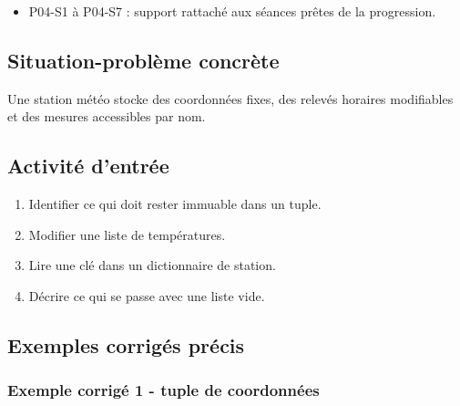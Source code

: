 \begin{itemize}
\tightlist
\item
  P04-S1 à P04-S7 : support rattaché aux séances prêtes de la
  progression.
\end{itemize}

\subsection{Situation-problème concrète}

Une station météo stocke des coordonnées fixes, des relevés horaires
modifiables et des mesures accessibles par nom.

\subsection{Activité d’entrée}

\begin{enumerate}
\def\labelenumi{\arabic{enumi}.}
\tightlist
\item
  Identifier ce qui doit rester immuable dans un tuple.
\item
  Modifier une liste de températures.
\item
  Lire une clé dans un dictionnaire de station.
\item
  Décrire ce qui se passe avec une liste vide.
\end{enumerate}

\subsection{Exemples corrigés précis}

\subsubsection{Exemple corrigé 1 - tuple de coordonnées}

